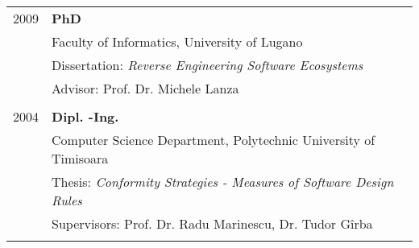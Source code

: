 
\newcommand{\degree}[5]{ \hspace{1.6cm}#2 & {\bf #1}\\ & #3\\ &#4\\ &#5\\ \\}

\begin{tabular}{ r p{11cm}}

\degree
	{PhD}
	{2009}
	{Faculty of Informatics, University of Lugano}
	{Dissertation: {\em Reverse Engineering Software Ecosystems}}
	{Advisor: Prof. Dr. Michele Lanza}

\degree
	{Dipl. -Ing.}
	{2004}
	{Computer Science Department, Polytechnic University of Timisoara}
	{Thesis: \emph{Conformity Strategies - Measures of Software Design Rules}}
	{Supervisors: Prof. Dr. Radu Marinescu, Dr. Tudor G\^irba}

\end{tabular}
